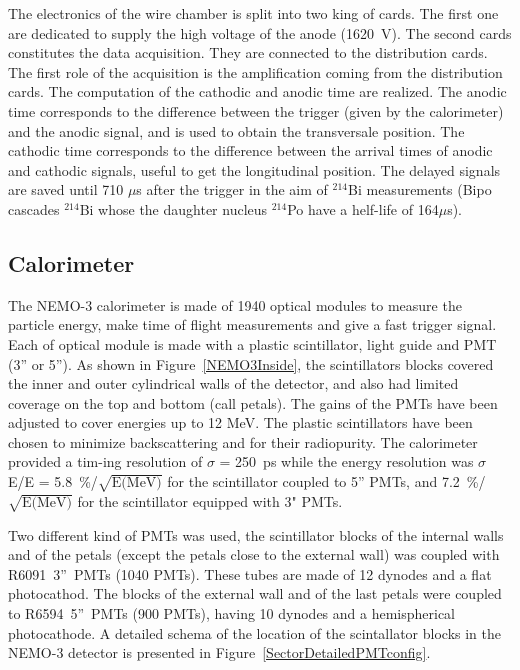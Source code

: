 \documentclass[main.tex]{subfiles}
\begin{document}
\bigskip

\NI The electronics of the wire chamber is split into two king of cards. The first one are dedicated to supply the high voltage of the anode (1620~V). The second cards constitutes the data acquisition. They are connected to the distribution cards. The first role of the acquisition is the amplification coming from the distribution cards. The computation of the cathodic and anodic time are realized. The anodic time corresponds to the difference between the trigger (given by the calorimeter) and the anodic signal, and is used to obtain the transversale position. The cathodic time corresponds to the difference between the arrival times of anodic and cathodic signals, useful to get the longitudinal position. The delayed signals are saved until 710 $\mu$s after the trigger in the aim of $^{\text{214}}$Bi measurements (Bipo cascades $^{\text{214}}$Bi whose the daughter nucleus $^{\text{214}}$Po have a helf-life of 164$\mu$s).  


\FloatBarrier


\subsection{Calorimeter}


\NI The NEMO-3 calorimeter is made of 1940 optical modules to measure the particle energy, make time of flight measurements and give a fast trigger signal. Each of optical module is made with a plastic scintillator, light guide and PMT (3'' or 5''). As shown in Figure~\ref{NEMO3Inside},  the scintillators blocks covered the inner and outer cylindrical walls of the detector, and also had limited coverage on the top and bottom (call petals). The gains of the PMTs have been adjusted to cover energies up to 12 MeV. The plastic scintillators have been chosen to minimize backscattering and for their radiopurity. The  calorimeter  provided  a  tim-ing  resolution  of $\sigma$ = 250~ps  while  the  energy  resolution  was $\sigma$E/E = 5.8~\%/$\sqrt{\text{E(MeV)}}$  for  the  scintillator coupled to 5'' PMTs, and 7.2~\%/$\sqrt{\text{E(MeV)}}$ for the scintillator equipped with 3" PMTs. 


\bigskip


\NI Two different kind of PMTs was used, the scintillator blocks of the internal walls and of the petals (except the petals close to the external wall) was coupled with R6091~3''~PMTs (1040 PMTs). These tubes are made of 12 dynodes and a flat photocathod. The blocks of the external wall and of the last petals were coupled to R6594~5''~PMTs (900 PMTs), having 10 dynodes and a hemispherical photocathode. A detailed schema of the location of the scintallator blocks in the NEMO-3 detector is presented in Figure~\ref{SectorDetailedPMTconfig}.
\end{document}
